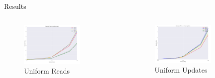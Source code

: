 \documentclass[pdf]{beamer}
\begin{document}
\begin{frame}{Results}
     \begin{columns}[T] %
     \begin{column}[T]{6cm} %
     \begin{center}
\begin{figure}[H]
\begin{center}
    \includegraphics[width=0.7\textwidth]{reads_unif}
    \caption{Uniform Reads}
\end{center}
\end{figure}
	\end{center}
     \end{column}
          \begin{column}[T]{6cm} %
\begin{figure}[H]
\begin{center}
    \includegraphics[width=0.7\textwidth]{updates_unif}
    \caption{Uniform Updates}
\end{center}
\end{figure}
    	\end{column}
     \end{columns}
\end{frame}
\end{document}

